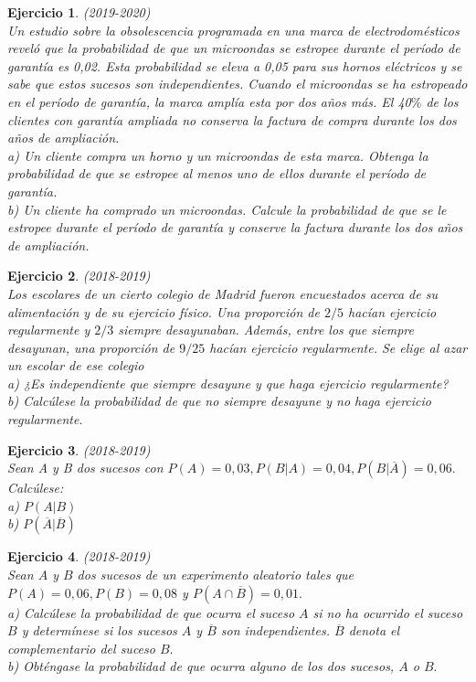 \documentclass[12pt, a4paper]{amsart}
\newtheorem{ejer}{Ejercicio}
\begin{document}
\begin{ejer}\em (2019-2020)\\
Un estudio sobre la obsolescencia programada en una marca de electrodomésticos reveló que la probabilidad
de que un microondas se estropee durante el período de garantía es 0,02. Esta probabilidad se eleva a 0,05 para
sus hornos eléctricos y se sabe que estos sucesos son independientes. Cuando el microondas se ha estropeado
en el período de garantía, la marca amplía esta por dos años más. El 40$\%$ de los clientes con garantía ampliada
no conserva la factura de compra durante los dos años de ampliación.\\
a) Un cliente compra un horno y un microondas de esta marca. Obtenga la probabilidad de que se estropee al
menos uno de ellos durante el período de garantía.\\
b) Un cliente ha comprado un microondas. Calcule la probabilidad de que se le estropee durante el período de
garantía y conserve la factura durante los dos años de ampliación.
\end{ejer}

\begin{ejer}\em (2018-2019)\\
Los escolares de un cierto colegio de Madrid fueron encuestados acerca de su alimentación y de su ejercicio
físico. Una proporción de $2/5$ hacían ejercicio regularmente y $2/3$ siempre desayunaban. Además, entre los que
siempre desayunan, una proporción de $9/25$ hacían ejercicio regularmente. Se elige al azar un escolar de ese
colegio\\
a) ¿Es independiente que siempre desayune y que haga ejercicio regularmente?\\
b) Calcúlese la probabilidad de que no siempre desayune y no haga ejercicio regularmente.
\end{ejer}

\begin{ejer}\em (2018-2019)\\
Sean A y B dos sucesos con $P(A) = 0,03, P(B | A) = 0,04, P(B | \overline{A}) = 0,06.$ Calcúlese:\\
a) $P(A | B)$\\
b) $P( \overline{A}| \overline{B})$
\end{ejer}

\begin{ejer}\em (2018-2019)\\
Sean $A$ y $B$ dos sucesos de un experimento aleatorio tales que $P(A) = 0,06, P(B) = 0,08$ y $P(A \cap \overline{B}) = 0,01.$\\
a) Calcúlese la probabilidad de que ocurra el suceso $A$ si no ha ocurrido el suceso $B$ y determínese si los
sucesos $A$ y $\overline{B}$ son independientes. $\overline{B}$ denota el complementario del suceso $B.$\\
b) Obténgase la probabilidad de que ocurra alguno de los dos sucesos, $A$ o $B.$
\end{ejer}
\end{document}
